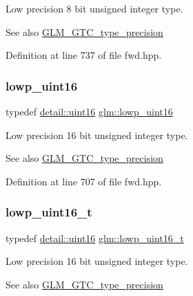 Low precision 8 bit unsigned integer type. \begin{DoxySeeAlso}{See also}
\mbox{\hyperlink{group__gtc__type__precision}{G\+L\+M\+\_\+\+G\+T\+C\+\_\+type\+\_\+precision}} 
\end{DoxySeeAlso}


Definition at line 737 of file fwd.\+hpp.

\mbox{\label{group__gtc__type__precision_ga9b8409887319f62f06e664f6ca121b9d}} 
\subsubsection{\texorpdfstring{lowp\_uint16}{lowp\_uint16}}
{\footnotesize\ttfamily typedef \mbox{\hyperlink{namespaceglm_1_1detail_a47b2a7d006d187338e8031a352d1ce56}{detail\+::uint16}} \mbox{\hyperlink{group__gtc__type__precision_ga9b8409887319f62f06e664f6ca121b9d}{glm\+::lowp\+\_\+uint16}}}

Low precision 16 bit unsigned integer type. \begin{DoxySeeAlso}{See also}
\mbox{\hyperlink{group__gtc__type__precision}{G\+L\+M\+\_\+\+G\+T\+C\+\_\+type\+\_\+precision}} 
\end{DoxySeeAlso}


Definition at line 707 of file fwd.\+hpp.

\mbox{\label{group__gtc__type__precision_ga9a71176a4e5bc61951f9e9197d9c80e1}} 
\subsubsection{\texorpdfstring{lowp\_uint16\_t}{lowp\_uint16\_t}}
{\footnotesize\ttfamily typedef \mbox{\hyperlink{namespaceglm_1_1detail_a47b2a7d006d187338e8031a352d1ce56}{detail\+::uint16}} \mbox{\hyperlink{group__gtc__type__precision_ga9a71176a4e5bc61951f9e9197d9c80e1}{glm\+::lowp\+\_\+uint16\+\_\+t}}}

Low precision 16 bit unsigned integer type. \begin{DoxySeeAlso}{See also}
\mbox{\hyperlink{group__gtc__type__precision}{G\+L\+M\+\_\+\+G\+T\+C\+\_\+type\+\_\+precision}} 
\end{DoxySeeAlso}


